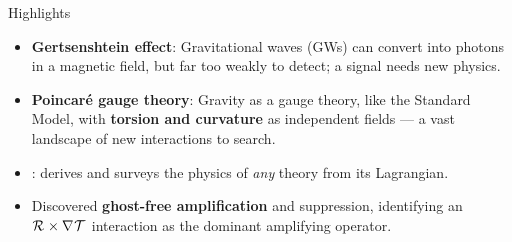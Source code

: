 \begin{block}{Highlights}
      \begin{itemize}
            \item \textbf{Gertsenshtein effect}: Gravitational waves (GWs) can convert into photons
                  in a magnetic field, but far too weakly to detect; a signal needs
                  new physics.
            \item \textbf{Poincar\'e gauge theory}: Gravity as a gauge theory, like the
                  Standard Model, with \textbf{torsion and curvature} as independent fields
                  --- a vast landscape of new interactions to search.
            \item \textbf{\TIDAL{}}: derives and surveys the physics of \emph{any} theory from
                  its Lagrangian.
            \item Discovered \textbf{ghost-free amplification} and suppression, identifying an
                  $\MAGF{}\times\rcD{}\MAGT{}$ interaction as the dominant amplifying operator.
      \end{itemize}
\end{block}
